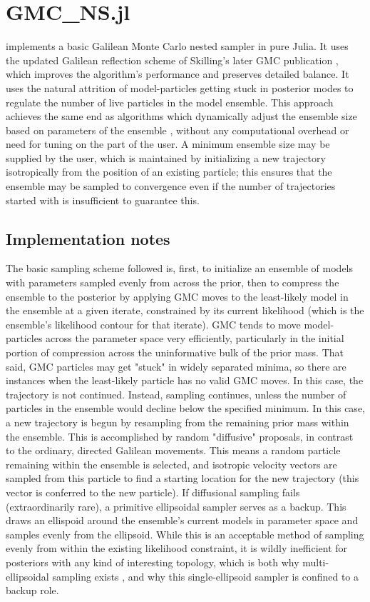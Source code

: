 \chapter{GMC\_NS.jl}
\label{ch:GMC}
 implements a basic Galilean Monte Carlo nested sampler \cite{Skilling2012,Skilling2019} in pure Julia. It uses the updated Galilean reflection scheme of Skilling's later GMC publication \cite{Skilling2019}, which improves the algorithm's performance and preserves detailed balance. It uses the natural attrition of model-particles getting stuck in posterior modes to regulate the number of live particles in the model ensemble. This approach achieves the same end as algorithms which dynamically adjust the ensemble size based on parameters of the ensemble \cite{Feroz2009,Higson2019}, without any computational overhead or need for tuning on the part of the user. A minimum ensemble size may be supplied by the user, which is maintained by initializing a new trajectory isotropically from the position of an existing particle; this ensures that the ensemble may be sampled to convergence even if the number of trajectories started with is insufficient to guarantee this. 

\section{Implementation notes}

The basic sampling scheme followed is, first, to initialize an ensemble of models with parameters sampled evenly from across the prior, then to compress the ensemble to the posterior by applying GMC moves to the least-likely model in the ensemble at a given iterate, constrained by its current likelihood (which is the ensemble's likelihood contour for that iterate). GMC tends to move model-particles across the parameter space very efficiently, particularly in the initial portion of compression across the uninformative bulk of the prior mass. That said, GMC particles may get "stuck" in widely separated minima, so there are instances when the least-likely particle has no valid GMC moves. In this case, the trajectory is not continued. Instead, sampling continues, unless the number of particles in the ensemble would decline below the specified minimum. In this case, a new trajectory is begun by resampling from the remaining prior mass within the ensemble. This is accomplished by random "diffusive" proposals, in contrast to the ordinary, directed Galilean movements. This means a random particle remaining within the ensemble is selected, and isotropic velocity vectors are sampled from this particle to find a starting location for the new trajectory (this vector is conferred to the new particle). If diffusional sampling fails (extraordinarily rare), a primitive ellipsoidal sampler serves as a backup. This draws an ellispoid around the ensemble's current models in parameter space and samples evenly from the ellipsoid. While this is an acceptable method of sampling evenly from within the existing likelihood constraint, it is wildly inefficient for posteriors with any kind of interesting topology, which is both why multi-ellipsoidal sampling exists \cite{Feroz2009}, and why this single-ellipsoid sampler is confined to a backup role.


